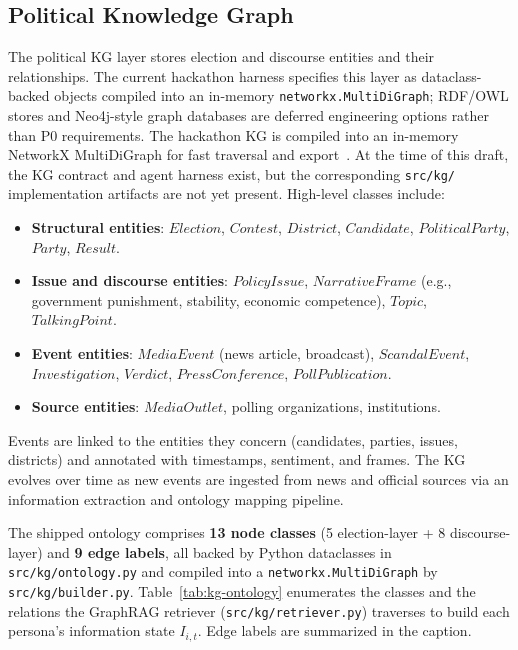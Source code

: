\documentclass[11pt]{article}
\begin{document}
\subsection{Political Knowledge Graph}

The political KG layer stores election and discourse entities and their relationships. The current hackathon harness specifies this layer as dataclass-backed objects compiled into an in-memory \texttt{networkx.MultiDiGraph}; RDF/OWL stores and Neo4j-style graph databases are deferred engineering options rather than P0 requirements. The hackathon KG is compiled into an in-memory NetworkX MultiDiGraph for fast traversal and export~\cite{hagberg2008networkx}. At the time of this draft, the KG contract and agent harness exist, but the corresponding \texttt{src/kg/} implementation artifacts are not yet present. High-level classes include:

\begin{itemize}
  \item \textbf{Structural entities}: $Election$, $Contest$, $District$, $Candidate$, $PoliticalParty$, $Party$, $Result$.
  \item \textbf{Issue and discourse entities}: $PolicyIssue$, $NarrativeFrame$ (e.g., government punishment, stability, economic competence), $Topic$, $TalkingPoint$.
  \item \textbf{Event entities}: $MediaEvent$ (news article, broadcast), $ScandalEvent$, $Investigation$, $Verdict$, $PressConference$, $PollPublication$.
  \item \textbf{Source entities}: $MediaOutlet$, polling organizations, institutions.
\end{itemize}

Events are linked to the entities they concern (candidates, parties, issues, districts) and annotated with timestamps, sentiment, and frames. The KG evolves over time as new events are ingested from news and official sources via an information extraction and ontology mapping pipeline.

The shipped ontology comprises \textbf{13 node classes} (5 election-layer + 8 discourse-layer) and \textbf{9 edge labels}, all backed by Python dataclasses in \texttt{src/kg/ontology.py} and compiled into a \texttt{networkx.MultiDiGraph} by \texttt{src/kg/builder.py}. Table~\ref{tab:kg-ontology} enumerates the classes and the relations the GraphRAG retriever (\texttt{src/kg/retriever.py}) traverses to build each persona's information state $I_{i,t}$. Edge labels are summarized in the caption.
\end{document}

